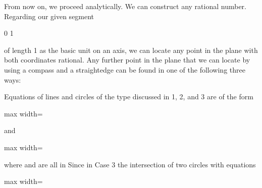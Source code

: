 \documentclass[11pt,oneside]{article}
\begin{document}
\begin{BookBody}

From now on, we proceed analytically. We can construct any rational number. Regarding our given segment

0 1

\noindent of length 1 as the basic unit on an axis, we can locate any point  in the plane with both coordinates rational. Any further point in the plane that we can locate by using a compass and a straightedge can be found in one of the following three ways:




Equations of lines and circles of the type discussed in 1, 2, and 3 are of the form

\begin{center}\begin{adjustbox}{max width=\linewidth}\end{adjustbox}\end{center}

\noindent and

\begin{center}\begin{adjustbox}{max width=\linewidth}\end{adjustbox}\end{center}

\noindent where  and  are all in  Since in Case 3 the intersection of two circles with equations

\begin{center}\begin{adjustbox}{max width=\linewidth}\end{adjustbox}\end{center}


\end{BookBody}
\end{document}
